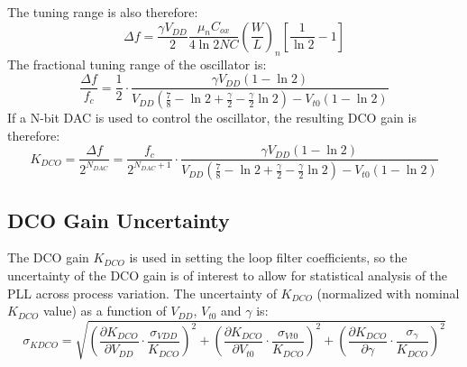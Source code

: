 		The tuning range is also therefore:
		\begin{equation}
			\Delta f = \frac{\gamma V_{DD}}{2}\frac{\mu_nC_{ox}}{4\ln2NC}\left(\frac{W}{L}\right)_n\left[\frac{1}{\ln2}-1\right]
		\end{equation}
		The fractional tuning range of the oscillator is:
		\begin{equation}
			\frac{\Delta f}{f_c} = \frac{1}{2}\cdot\frac{\gamma V_{DD}\left( 1-\ln2 \right)}{V_{DD}\left(\frac{7}{8}-\ln2+\frac{\gamma}{2}-\frac{\gamma}{2}\ln2\right)-V_{t0}\left(1-\ln2\right)}
		\end{equation}	
		If a N-bit DAC is used to control the oscillator, the resulting DCO gain is therefore:
		\begin{equation}
			K_{DCO} = \frac{\Delta f}{2^{N_{DAC}}} = \frac{f_c}{2^{N_{DAC}+1}}\cdot\frac{\gamma V_{DD}\left( 1-\ln2 \right)}{V_{DD}\left(\frac{7}{8}-\ln2+\frac{\gamma}{2}-\frac{\gamma}{2}\ln2\right)-V_{t0}\left(1-\ln2\right)}
		\end{equation}	
	\subsection{DCO Gain Uncertainty}
		The DCO gain $K_{DCO}$ is used in setting the loop filter coefficients, so the uncertainty of the DCO gain is of interest to allow for statistical analysis of the PLL across process variation. The uncertainty of $K_{DCO}$ (normalized with nominal $K_{DCO}$ value) as a function of $V_{DD}$, $V_{t0}$ and $\gamma$ is:
		\begin{equation}
			\sigma_{KDCO} = \sqrt{\left(\frac{\partial K_{DCO}}{\partial V_{DD}}\cdot\frac{\sigma_{VDD}}{K_{DCO}} \right)^2 + \left(\frac{\partial K_{DCO}}{\partial V_{t0}}\cdot\frac{\sigma_{Vt0}}{K_{DCO}} \right)^2 + \left(\frac{\partial K_{DCO}}{\partial \gamma}\cdot\frac{\sigma_\gamma}{K_{DCO}} \right)^2}
		\end{equation}

